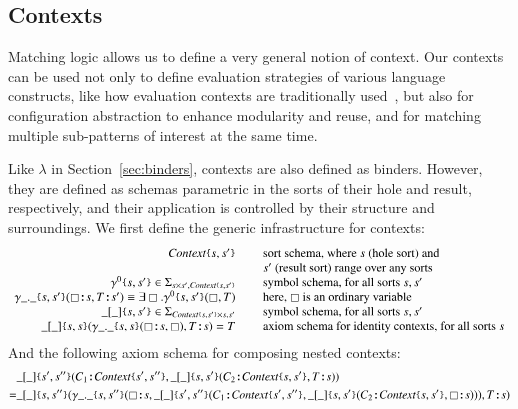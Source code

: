 \documentclass[UTF8,11pt]{article}
\theoremstyle{plain}
\theoremstyle{definition}
\theoremstyle{remark}
\newcommand{\cln}{\texttt{:}}
\newcommand{\Context}{\textit{Context}}
\newcommand{\hole}{\boxempty}
\newcommand{\parametric}[2]{{#1}\raisebox{.2ex}{\texttt{\footnotesize{\{}}}#2\raisebox{.2ex}{\texttt{\footnotesize{\}}}}}
\newcommand{\parametricscript}[2]{{#1}\raisebox{.2ex}{\texttt{\tiny{\{}}}#2\raisebox{.2ex}{\texttt{\tiny{\}}}}}
\begin{document}
\subsection{Contexts}

Matching logic allows us to define a very general notion of context.
Our contexts can be used not only to define evaluation strategies of
various language constructs, like how evaluation contexts are
traditionally used~\cite{felleisen-hieb-92}, but also for configuration
abstraction to enhance modularity and reuse, and for matching multiple
sub-patterns of interest at the same time.

Like $\lambda$ in Section~\ref{sec:binders}, contexts are also defined
as binders.
However, they are defined as schemas parametric in the sorts of their
hole and result, respectively, and their application is controlled by
their structure and surroundings.
We first define the generic infrastructure for contexts:
$$
\begin{array}{r@{\hspace*{5ex}}l}
\parametric{\Context}{s,s'} &
\textrm{sort schema, where $s$ (hole sort) and}
\\ &\textrm{$s'$ (result sort) range over any sorts}
\\ \parametric{\gamma^0}{s,s'} \in \Sigma_{s \times s',
\parametricscript{\Context}{s,s'}}
& \textrm{symbol schema, for all sorts $s, s'$}
\\ \parametric{\gamma\_.\_}{s,s'}(\hole\cln s,T\cln s') \equiv \exists \hole .
\parametric{\gamma^0}{s,s'}(\hole,T)
& \textrm{here, $\hole$ is an ordinary variable}
\\
\parametric{\_[\_]}{s,s'} \in \Sigma_{\parametricscript{\Context}{s,s'} \times s, s'}
& \textrm{symbol schema, for all sorts $s, s'$}
\\
\parametric{\_[\_]}{s,s}(\parametric{\gamma\_.\_}{s,s}(\hole\cln s, \hole),T\cln s) = T
& \textrm{axiom schema for identity contexts, for all sorts $s$}
\end{array}
$$
And the following axiom schema for composing nested contexts:
\begin{align*}
&\parametric{\_[\_]}{s',s''}(C_1 \cln \parametric{\Context}{s',s''},
\parametric{\_[\_]}{s,s'}(C_2 \cln \parametric{\Context}{s,s'},
T\cln s))
\\
= &
\parametric{\_[\_]}{s,s''}(
\parametric{\gamma\_.\_}{s,s''}(\hole\cln s,
\parametric{\_[\_]}{s',s''}(
C_1 \cln \parametric{\Context}{s',s''},
\parametric{\_[\_]}{s,s'}(C_2 \cln \parametric{\Context}{s,s'},
\hole\cln s))
), T\cln s)
\end{align*}
\end{document}
